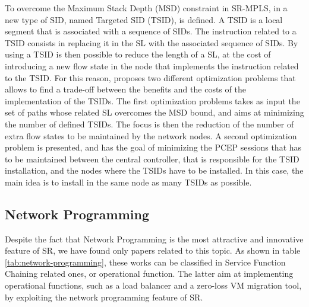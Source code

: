 To overcome the Maximum Stack Depth (MSD) constraint in SR-MPLS, in \cite{guedrez2017new} a new type of SID, named Targeted SID (TSID), is defined.
A TSID is a local segment that is associated with a sequence of SIDs. 
The instruction related to a TSID consists in replacing it in the SL with the associated sequence of SIDs.
By using a TSID is then possible to reduce the length of a SL, at the cost of introducing a new flow state in the node that implements the instruction related to the TSID.
For this reason, \cite{guedrez2017new} proposes two different optimization problems that allows to find a trade-off between the benefits and the costs of the implementation of the TSIDs.
The first optimization problems takes as input the set of paths whose related SL overcomes the MSD bound, and aims at minimizing the number of defined TSIDs. 
The focus is then the reduction of the number of extra flow states to be maintained by the network nodes.
A second optimization problem is presented, and has the goal of minimizing the PCEP sessions that has to be maintained between the central controller, that is responsible for the TSID installation, and the nodes where the TSIDs have to be installed.
In this case, the main idea is to install in the same node as many TSIDs as possible.

\subsection{Network Programming}
\label{sec:netprog}

Despite the fact that Network Programming is the most attractive and innovative feature of SR, we have found only \networkProgPapers papers related to this topic.
As shown in table \ref{tab:network-programming}, these works can be classified in Service Function Chaining related ones, or operational function.
The latter aim at implementing operational functions, such as a load balancer and a zero-loss VM migration tool, by exploiting the network programming feature of SR.

